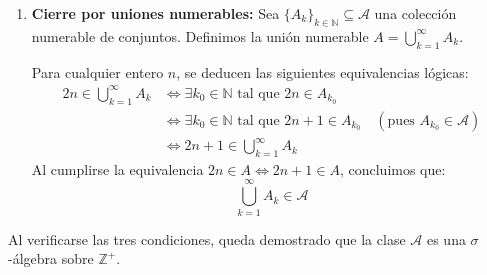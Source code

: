 \begin{problema}
\begin{enumerate}[label=\alph*)]
    \item \textbf{Cierre por uniones numerables:}
    Sea $\{A_k\}_{k \in \mathbb{N}} \subseteq \mathcal{A}$ una colección numerable de conjuntos. Definimos la unión numerable $A = \bigcup_{k=1}^\infty A_k$.
    
    Para cualquier entero $n$, se deducen las siguientes equivalencias lógicas:
    \begin{align*}
        2n \in \bigcup_{k=1}^\infty A_k &\iff \exists k_0 \in \mathbb{N} \text{ tal que } 2n \in A_{k_0} \\
        &\iff \exists k_0 \in \mathbb{N} \text{ tal que } 2n+1 \in A_{k_0} \quad (\text{pues } A_{k_0} \in \mathcal{A}) \\
        &\iff 2n+1 \in \bigcup_{k=1}^\infty A_k
    \end{align*}
    Al cumplirse la equivalencia $2n \in A \iff 2n+1 \in A$, concluimos que:
    \[
        \bigcup_{k=1}^\infty A_k \in \mathcal{A}
    \]
\end{enumerate}

Al verificarse las tres condiciones, queda demostrado que la clase $\mathcal{A}$ es una $\sigma$-álgebra sobre $\mathbb{Z}^+$.

\end{problema}
\newpage
